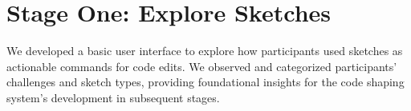 




\section{Stage One: Explore Sketches} 
We developed a basic user interface to explore how participants used sketches as actionable commands for code edits. We observed and categorized participants' challenges and sketch types, providing foundational insights for the code shaping system's development in subsequent stages.


